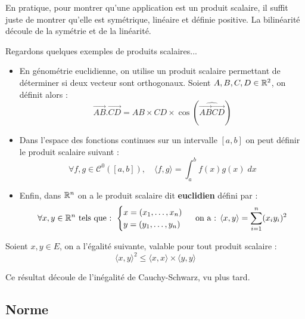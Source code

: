 \begin{remark}
    En pratique, pour montrer qu'une application est un produit scalaire, il suffit juste de montrer qu'elle est symétrique, 
    linéaire et définie positive. La bilinéarité découle de la symétrie et de la linéarité.  
\end{remark}

\begin{example}
    Regardons quelques exemples de produits scalaires...
    \begin{itemize}
        \item En génométrie euclidienne, on utilise un produit scalaire permettant de déterminer si deux vecteur sont 
        orthogonaux. Soient $A,B,C,D \in \mathbb{R}^2$, on définit alors :
            \[ \vec{AB}.\vec{CD} = AB \times CD \times \cos (\widehat{\vec{AB}\vec{CD}}) \]
        \item Dans l'espace des fonctions continues sur un intervalle $[a,b]$ on peut définir le produit scalaire suivant :
            \[ \forall f,g \in \mathcal{C}^0([a,b]), \quad \langle f,g \rangle = \int_{a}^{b} f(x)g(x) \; dx \] 
        \item Enfin, dans $\mathbb{R}^n$ on a le produit scalaire dit \textbf{euclidien} défini par : 
            \[ \forall x,y \in \mathbb{R}^n \text{ tels que : }
                \begin{cases}
                    x = (x_1, \dots, x_n) \\ 
                    y = (y_1, \dots, y_n)
                \end{cases}
                \text{ on a  : }
                \langle x,y \rangle = \sum_{i=1}^n (x_i y_i)^2 
            \] 
    \end{itemize}
\end{example}

\begin{prop}
    Soient $x,y \in E$, on a l'égalité suivante, valable pour tout produit scalaire :
        \[ \boxed{ \langle x,y \rangle ^2 \leq \langle x,x \rangle \times \langle y,y \rangle } \] 
\end{prop}

\begin{remark}
    Ce résultat découle de l'inégalité de Cauchy-Schwarz, vu plus tard. 
\end{remark}


\subsection{Norme}

